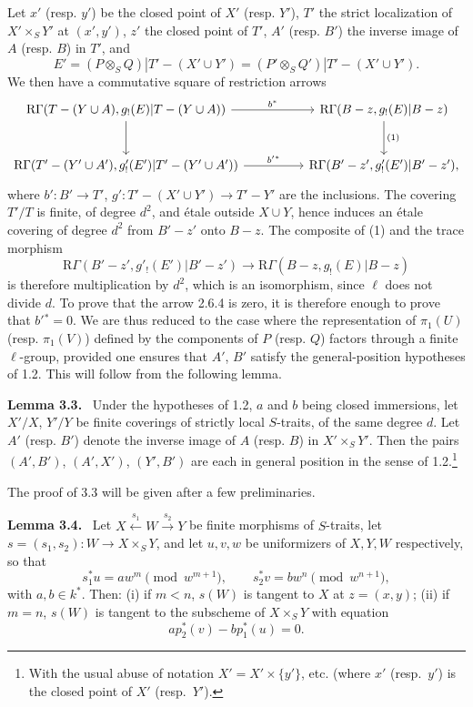 \documentclass[11pt]{article}
\newenvironment{statement}[1]{\par\medskip\noindent\textbf{#1.}\ }{\par\medskip}
\begin{document}
Let $x'$ (resp. $y'$) be the closed point of $X'$ (resp. $Y'$), $T'$ the strict localization of $X'\times_S Y'$ at $(x',y')$, $z'$ the closed point of $T'$, $A'$ (resp. $B'$) the inverse image of $A$ (resp. $B$) in $T'$, and
\[
E'=(P\otimes_SQ)|T'-(X'\cup Y')
   =(P'\otimes_SQ')|T'-(X'\cup Y').
\]
We then have a commutative square of restriction arrows
\[
\begin{tikzcd}[column sep=huge,row sep=large]
\mathrm R\Gamma(T-(Y\cup A),g_!(E)|T-(Y\cup A))
 \arrow[r,"b^*"] \arrow[d]
&
\mathrm R\Gamma(B-z,g_!(E)|B-z) \arrow[d,"(1)"]\\
\mathrm R\Gamma(T'-(Y'\cup A'),g'_!(E')|T'-(Y'\cup A'))
 \arrow[r,"b'{}^*"]
&
\mathrm R\Gamma(B'-z',g'_!(E')|B'-z') ,
\end{tikzcd}
\]
where $b':B'\to T'$, $g':T'-(X'\cup Y')\to T'-Y'$ are the inclusions. The covering $T'/T$ is finite, of degree $d^2$, and étale outside $X\cup Y$, hence induces an étale covering of degree $d^2$ from $B'-z'$ onto $B-z$. The composite of (1) and the trace morphism
\[
\mathrm R\Gamma(B'-z',g'_!(E')|B'-z')
 \longrightarrow
\mathrm R\Gamma(B-z,g_!(E)|B-z)
\]
is therefore multiplication by $d^2$, which is an isomorphism, since $\ell$ does not divide $d$. To prove that the arrow 2.6.4 is zero, it is therefore enough to prove that $b'{}^*=0$. We are thus reduced to the case where the representation of $\pi_1(U)$ (resp. $\pi_1(V)$) defined by the components of $P$ (resp. $Q$) factors through a finite $\ell$-group, provided one ensures that $A'$, $B'$ satisfy the general-position hypotheses of 1.2. This will follow from the following lemma.

\begin{statement}{Lemma 3.3}
Under the hypotheses of 1.2, $a$ and $b$ being closed immersions, let $X'/X$, $Y'/Y$ be finite coverings of strictly local $S$-traits, of the same degree $d$. Let $A'$ (resp. $B'$) denote the inverse image of $A$ (resp. $B$) in $X'\times_S Y'$. Then the pairs $(A',B')$, $(A',X')$, $(Y',B')$ are each in general position in the sense of 1.2.\footnote{With the usual abuse of notation $X'=X'\times\{y'\}$, etc. (where $x'$ (resp.\ $y'$) is the closed point of $X'$ (resp.\ $Y'$).}
\end{statement}

The proof of 3.3 will be given after a few preliminaries.

\begin{statement}{Lemma 3.4}
Let $X\xleftarrow{s_1}W\xrightarrow{s_2}Y$ be finite morphisms of $S$-traits, let $s=(s_1,s_2):W\to X\times_SY$, and let $u,v,w$ be uniformizers of $X,Y,W$ respectively, so that
\[
s_1^*u=aw^m\pmod {w^{m+1}},\qquad
s_2^*v=bw^n\pmod {w^{n+1}},
\]
with $a,b\in k^*$. Then: (i) if $m<n$, $s(W)$ is tangent to $X$ at $z=(x,y)$; (ii) if $m=n$, $s(W)$ is tangent to the subscheme of $X\times_SY$ with equation
\[
ap_2^*(v)-bp_1^*(u)=0.
\]
\end{statement}
\end{document}
